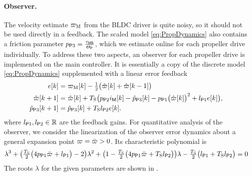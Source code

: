 \paragraph*{Observer.}
The velocity estimate $\PropVelMeas$ from the BLDC driver is quite noisy, so it should not be used directly in a feedback.
The scaled model \eqref{eq:PropDynamics} also contains a friction parameter $\PropParam[3] = \tfrac{\BLDCFriction}{\PropInertia}$, which we estimate online for each propeller drive individually.
To address these two aspects, an observer for each propeller drive is implemented on the main controller.
It is essentially a copy of the discrete model \eqref{eq:PropDynamics} supplemented with a linear error feedback
\begin{subequations}\label{eq:PropObserver}
\begin{align}
 e[k] &= \PropVelMeas[][k] - \tfrac{1}{2} \big( \PropVelObs[][k] + \PropVelObs[][k-1] \big)
\\
 \PropVelObs[][k+1] &= \PropVelObs[][k] + \Ts \big( \PropParam[2] \BLDCCurr[][k] - \PropParamObs[3][k] - \PropParam[1] \big( \PropVelObs[][k]\big)^2 + \PropObsGainVel e[k] \big),
\\
 \PropParamObs[3][k+1] &= \PropParamObs[3][k] + \Ts \PropObsGainBias e[k].
\end{align}
\end{subequations}
where $\PropObsGainVel, \PropObsGainBias \in \RealNum$ are the feedback gains.
For quantitative analysis of the observer, we consider the linearization of the observer error dynamics about a general expansion point $\PropVel = \PropVelStat > 0$.
Its characteristic polynomial is
\begin{align}
 \lambda^3 
 + \big( \tfrac{\Ts}{2} \big( 4 \PropParam[1] \PropVelStat + \PropObsGainVel \big) - 2 \big) \lambda^2
 + \big( 1 - \tfrac{\Ts}{2} \big( 4 \PropParam[1] \PropVelStat + \Ts \PropObsGainBias \big) \big) \lambda
 - \tfrac{\Ts}{2} \big( \PropObsGainVel + \Ts \PropObsGainBias \big)
 = 0
\end{align}
The roots $\lambda$ for the given parameters are shown in .



